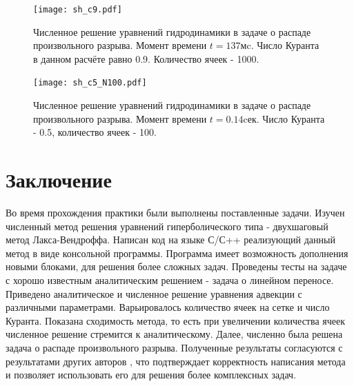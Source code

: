 \documentclass[a4paper]{article}
\begin{document}
	\begin{figure}%
		\centering
		\texttt{[image: sh\_c9.pdf]}
		\caption{Численное решение уравнений гидродинамики в задаче о распаде произвольного разрыва. Момент времени $t = 137$мc. Число Куранта в данном расчёте равно 0.9. Количество ячеек - 1000.}
		\label{ShockwavePlot}
	\end{figure}

	\begin{figure}%
		\centering
		\texttt{[image: sh\_c5\_N100.pdf]}
		\caption{Численное решение уравнений гидродинамики в задаче о распаде произвольного разрыва. Момент времени $t = 0.14$cек. Число Куранта - 0.5, количество ячеек - 100.}
		\label{ShockwavePlot2}
	\end{figure}
	\newpage
	\section{Заключение}
	Во время прохождения практики были выполнены поставленные задачи. Изучен численный метод решения уравнений гиперболического типа - двухшаговый метод Лакса-Вендроффа. Написан код на языке С/С++ реализующий данный метод в виде консольной программы. Программа имеет возможность дополнения новыми блоками, для решения более сложных задач. Проведены тесты на задаче с хорошо известным аналитическим решением - задача о линейном переносе. Приведено аналитическое и численное решение уравнения адвекции с различными параметрами. Варьировалось количество ячеек на сетке и число Куранта. Показана сходимость метода, то есть при увеличении количества ячеек численное решение стремится к аналитическому. Далее, численно была решена задача о распаде произвольного разрыва. Полученные результаты согласуются с результатами других авторов \cite{Bisikalo}, что подтверждает корректность написания метода и позволяет использовать его для решения более комплексных задач.
	
\end{document}
